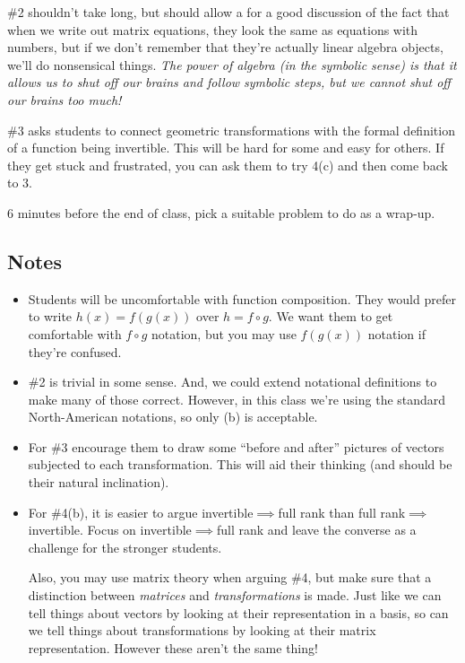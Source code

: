 		\#2 shouldn't take long, but should allow a for a good discussion of the fact that
		when we write out matrix equations, they look the same as equations with numbers, but if
		we don't remember that they're actually linear algebra objects, we'll do nonsensical things.
		\emph{The power of algebra (in the symbolic sense) is that it allows us to shut off our brains
		and follow symbolic steps, but we cannot shut off our brains too much!}

		\#3 asks students to connect geometric transformations with
		the formal definition of a function being invertible. This will be hard for some and easy for
		others. If they get stuck and frustrated, you can ask them to try 4(c) and then come back to 3.

		6 minutes before the end of class, pick a suitable problem to do as a wrap-up.

\subsection*{Notes}
	\begin{itemize}
		\item Students will be uncomfortable with function composition. They would prefer
			to write $h(x) = f(g(x))$ over $h=f\circ g$. We want them to get comfortable
			with $f\circ g$ notation, but you may use $f(g(x))$ notation if they're confused.
		\item \#2 is trivial in some sense. And, we could extend notational definitions to
			make many of those correct. However, in this class we're using the standard
			North-American notations, so only (b) is acceptable.
		\item For \#3 encourage them to draw some ``before and after'' pictures of vectors
			subjected to each transformation. This will aid their thinking (and should
			be their natural inclination).
		\item For \#4(b), it is easier to argue invertible$\implies$full rank than
			full rank$\implies$invertible. Focus on invertible$\implies$full rank and
			leave the converse as a challenge for the stronger students.

			Also, you may use matrix theory when arguing \#4, but make sure
			that a distinction between \emph{matrices} and \emph{transformations} is made.
			Just like we can tell things about vectors by looking
			at their representation in a basis, so can we tell things about transformations
			by looking at their matrix representation. However these aren't the same thing!
	\end{itemize}